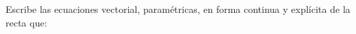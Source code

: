 \documentclass[addpoints,spanish, 12pt,a4paper]{exam}
\begin{document}
\begin{questions}



\question Escribe las ecuaciones vectorial, paramétricas, en forma continua y explícita de la recta que:\begin{parts} 

\end{parts}
\end{questions}
\end{document}
